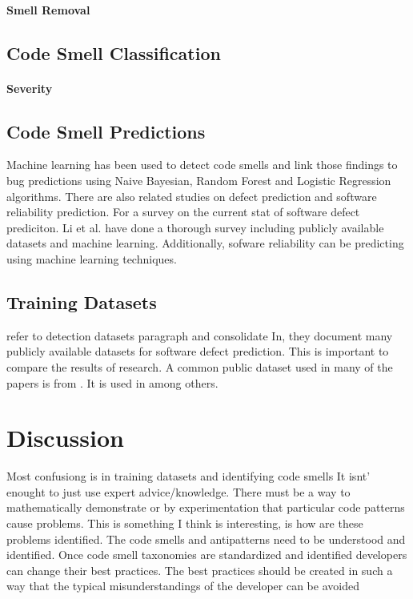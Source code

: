 \documentclass[conference]{IEEEtran}
\begin{document}
\paragraph{Smell Removal}

\subsection{Code Smell Classification}

\paragraph{Severity}

\subsection{Code Smell Predictions}
Machine learning has been used to detect code smells and link those findings to bug predictions\cite{ubayawardana_bug_2018} using Naive Bayesian, Random Forest and Logistic Regression algorithms.
There are also related studies on defect prediction and software reliability prediction.
For a survey on the current stat of software defect prediciton\cite{li_progress_2018}. Li et al. have done a thorough survey including publicly available datasets and machine learning.
Additionally, sofware reliability can be predicting using machine learning techniques\cite{kulamala_predicting_2018}.

\subsection{Training Datasets}
refer to detection datasets paragraph and consolidate
In\cite{li_progress_2018}, they document many publicly available datasets for software defect prediction. This is important to compare the results of research.
A common public dataset used in many of the papers is from \cite{fontana_code_2017}. It is used in \cite{karaduzovic-hadziabdic_comparison_2018} among others.

\section{Discussion}
Most confusiong is in training datasets and identifying code smells
It isnt' enought to just use expert advice/knowledge. 
There must be a way to mathematically demonstrate or by experimentation that particular code patterns cause problems.
This is something I think is interesting, is how are these problems identified.
The code smells and antipatterns need to be understood and identified.
Once code smell taxonomies are standardized and identified developers can change their best practices.
The best practices should be created in such a way that the typical misunderstandings of the developer can be avoided
\end{document}
